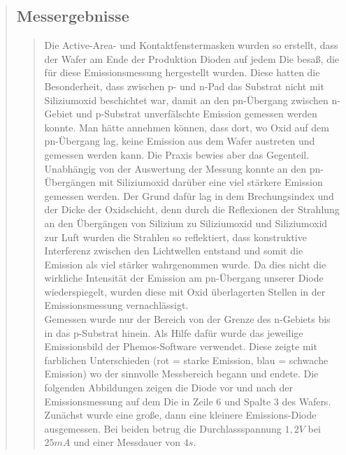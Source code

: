 \begin{quote}
\begin{quote}
        \end{quote}
        
        \subsection{Messergebnisse}
        \begin{quote}
        
        Die Active-Area- und Kontaktfenstermasken wurden so erstellt, dass der
        Wafer am Ende der Produktion Dioden auf jedem Die besaß, die für diese
        Emissionsmessung hergestellt wurden. Diese hatten die Besonderheit, dass
        zwischen p- und n-Pad das Substrat nicht mit Siliziumoxid beschichtet
        war, damit an den pn-Übergang zwischen n-Gebiet und p-Substrat
        unverfälschte Emission gemessen werden konnte. Man hätte annehmen
        können, dass dort, wo Oxid auf dem pn-Übergang lag, keine Emission aus
        dem Wafer austreten und gemessen werden kann. Die Praxis bewies aber das
        Gegenteil. Unabhängig von der Auswertung der Messung
        konnte an den pn-Übergängen mit Siliziumoxid darüber eine viel stärkere
        Emission gemessen werden. Der Grund dafür lag in dem Brechungsindex und
        der Dicke der Oxidschicht, denn durch die Reflexionen der Strahlung an
        den Übergängen von Silizium zu Siliziumoxid und Siliziumoxid zur Luft
        wurden die Strahlen so reflektiert, dass konstruktive Interferenz
        zwischen den Lichtwellen entstand und somit die Emission als viel
        stärker wahrgenommen wurde. Da dies nicht die wirkliche Intensität der
        Emission am pn-Übergang unserer Diode wiederspiegelt, wurden diese mit
        Oxid überlagerten Stellen in der Emissionsmessung vernachlässigt.\\
        
        Gemessen wurde nur der Bereich von der Grenze des n-Gebiets bis in
        das p-Substrat hinein. Als Hilfe dafür wurde das jeweilige Emissionsbild
        der Phemos-Software verwendet. Diese zeigte mit farblichen Unterschieden
        (rot = starke Emission, blau = schwache Emission) wo der sinnvolle
        Messbereich begann und endete. Die folgenden Abbildungen zeigen die
        Diode vor und nach der Emissionsmessung auf dem Die in Zeile $6$ und
        Spalte $3$ des Wafers. Zunächst wurde eine große, dann eine kleinere
        Emissions-Diode ausgemessen. Bei beiden betrug die Durchlassspannung
        $1,2 V$ bei $25 mA$ und einer Messdauer von $4s$.
        

\end{quote}
\end{quote}
